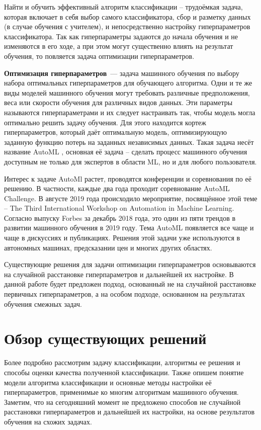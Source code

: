 \documentclass[times,specification,annotation]{itmo-student-thesis}
\begin{document}
	Найти и обучить эффективный алгоритм классификации -- трудоёмкая задача, которая включает в себя выбор самого классификатора, сбор и разметку данных (в случае обучения с учителем), и непосредственно настройку гиперпараметров классификатора. Так как гиперпараметры задаются до начала обучения и не изменяются в его ходе, а при этом могут существенно влиять на результат обучения, то повляется задача оптимизации гиперпараметров. \par
	

	\textbf{Оптимизация гиперпараметров} — задача машинного обучения по выбору набора оптимальных гиперпараметров для обучающего алгоритма. Одни и те же виды моделей машинного обучения могут требовать различные предположения, веса или скорости обучения для различных видов данных. Эти параметры называются гиперпараметрами и их следует настраивать так, чтобы модель могла оптимально решить задачу обучения. Для этого находится кортеж гиперпараметров, который даёт оптимальную модель, оптимизирующую заданную функцию потерь на заданных независимых данных. Такая задача несёт название AutoML \cite{feurer-automlbook19a}, основная её задача -- сделать процесс машинного обучения доступным не только для экспертов в области ML, но и для любого пользователя. 
	
	Интерес к задаче AutoMl растет, проводятся конференции и соревнования по её решению. В частности, каждые два года проходит соревнование AutoML Challenge. В августе 2019 года происходило мероприятие, посвящённое этой теме -- The Third International Workshop on Automation in Machine Learning. Согласно выпуску Forbes за декабрь 2018 года, это один из пяти трендов в развитии машинного обучения в 2019 году. Тема AutoML появляется все чаще и чаще в дискуссиях и публикациях. Решения этой задачи уже используются в автономных машинах, предсказании цен и многих других областях.
	
	Существующие решения \cite{lindauer2017warmstarting, HutHooLey10-TR, NIPS2015_5872, falkner-icml-18} для задачи оптимизации гиперпараметров основываются на случайной расстановке гиперпараметров и дальнейшей их настройке. В данной работе будет предложен подход, основанный не на случайной расстановке первичных гиперпараметров, а на особом подходе, основанном на результатах обучения смежных задач.\par

	
	\chapter{Обзор существующих решений}
	Более подробно рассмотрим задачу классификации, алгоритмы ее решения и способы оценки качества полученной классификации. Также опишем понятие модели алгоритма классификации и основные методы настройки её гиперпараметров, применимые ко многим алгоритмам машинного обучения.
	Заметим, что на сегодняшний момент не предложено способов не случайной расстановки гиперпараметров и дальнейшей их настройки, на основе результатов обучения на схожих задачах.
	\startrelatedwork
	
\end{document}
